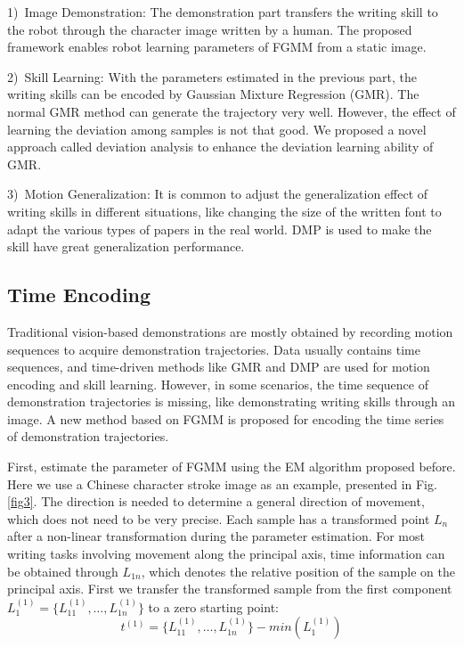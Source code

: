 \documentclass[conference]{IEEEtran}
\begin{document}
1)~Image Demonstration: The demonstration part transfers the writing skill to the robot through the character image written by a human. The proposed framework enables robot learning parameters of FGMM from a static image. 

2)~Skill Learning: With the parameters estimated in the previous part, the writing skills can be encoded by Gaussian Mixture Regression (GMR). The normal GMR method can generate the trajectory very well. However, the effect of learning the deviation among samples is not that good. We proposed a novel approach called deviation analysis to enhance the deviation learning ability of GMR.

3)~Motion Generalization: It is common to adjust the generalization effect of writing skills in different situations, like changing the size of the written font to adapt the various types of papers in the real world. DMP is used to make the skill have great generalization performance.

\subsection{Time Encoding}
Traditional vision-based demonstrations are mostly obtained by recording motion sequences to acquire demonstration trajectories. Data usually contains time sequences, and time-driven methods like GMR and DMP are used for motion encoding and skill learning. However, in some scenarios, the time sequence of demonstration trajectories is missing, like demonstrating writing skills through an image. A new method based on FGMM is proposed for encoding the time series of demonstration trajectories.

First, estimate the parameter of FGMM using the EM algorithm proposed before. Here we use a Chinese character stroke image as an example, presented in Fig.\ref{fig3}. The direction is needed to determine a general direction of movement, which does not need to be very precise. Each sample has a transformed point $L_n$ after a non-linear transformation during the parameter estimation. For most writing tasks involving movement along the principal axis, time information can be obtained through $L_{1n}$, which denotes the relative position of the sample on the principal axis. First we transfer the transformed sample from the first component $L_{1}^{(1)}=\{L_{11}^{(1)}, \hdots, L_{1n}^{(1)}\}$ to a zero starting point:
\begin{equation}
    t^{(1)}=\{L_{11}^{(1)}, \hdots, L_{1n}^{(1)}\}-min(L_{1}^{(1)})
\end{equation}
\end{document}
